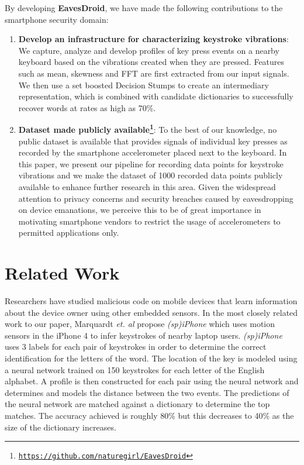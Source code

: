 \documentclass[11pt,conference]{IEEEtran}
\renewcommand{\comment}[1]{}
\begin{document}
By developing \textbf{EavesDroid}, we have made the following contributions to the smartphone security domain:
\begin{enumerate}
\item {\bf Develop an infrastructure for characterizing keystroke vibrations}: We
capture, analyze and develop profiles of key press events on a nearby
keyboard based on the vibrations created when they are pressed. Features such as mean, skewness and FFT are first extracted from our input signals. We then use a set boosted Decision Stumps to create an intermediary
representation, which is combined with candidate dictionaries
to successfully recover words at rates as high as 70\%.
\item {\bf Dataset made publicly available\footnote{\texttt{\url{https://github.com/naturegirl/EavesDroid}}}}: To the best of our knowledge,
no public dataset is available that provides signals of individual key presses as recorded by the smartphone accelerometer placed next to the keyboard. In this paper, we present our pipeline for recording data points for keystroke vibrations and we make the dataset of 1000 recorded data points publicly available to enhance further research in this area. Given
the widespread attention to privacy concerns and security breaches caused by eavesdropping on device emanations, we perceive this to be
of great importance in motivating smartphone vendors
to restrict the usage of accelerometers to permitted applications only.\\
\end{enumerate}
\comment{The remainder of the paper is structured as follows: 
We present related work in recovering keystrokes from keyboard vibrations in Section~\ref{sec:related}. We then describe our threat model and our constructed framework. Section~\ref{sec:implementation} include analysis and implementation, and the framework work flow. We show experimental results in Section~\ref{sec:experimentation} and conclude in Section~\ref{sec:conclusion}.}
\section{Related Work}
\label{sec:related}
Researchers have studied malicious code on mobile devices that
learn information about the device owner using other embedded sensors.
In the most closely related work to our paper, Marquardt \emph{et. al}
\cite{spiphone} propose \emph{(sp)iPhone} which uses motion sensors in the
iPhone 4
to infer keystrokes of nearby laptop users. \emph{(sp)iPhone} uses 3 labels for
each pair of keystrokes in order to determine the correct identification for
the letters of the word. The location of the key is modeled using a neural
network trained on 150 keystrokes for each letter of the English alphabet.
A profile is then constructed for each pair using the neural network and
determines and models the distance between the two events. The predictions
of the neural network are matched against a dictionary to determine the top
matches. The accuracy achieved is roughly 80\% but this decreases to 40\%
as the size of the dictionary increases.
\end{document}
